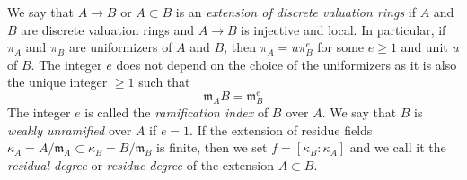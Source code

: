 \begin{definition}
\label{definition-extension-discrete-valuation-rings}
We say that $A \to B$ or $A \subset B$ is an
{\it extension of discrete valuation rings} if $A$ and $B$ are
discrete valuation rings and $A \to B$ is injective and local.
In particular, if $\pi_A$ and $\pi_B$ are uniformizers of
$A$ and $B$, then $\pi_A = u \pi_B^e$ for some $e \geq 1$ and unit
$u$ of $B$. The integer $e$ does not depend on the choice of
the uniformizers as it is also the unique integer $\geq 1$ such that
$$
\mathfrak m_A B = \mathfrak m_B^e
$$
The integer $e$ is called the {\it ramification index} of $B$ over $A$.
We say that $B$ is {\it weakly unramified} over $A$ if $e = 1$.
If the extension of residue fields
$\kappa_A = A/\mathfrak m_A \subset \kappa_B = B/\mathfrak m_B$
is finite, then we set $f = [\kappa_B : \kappa_A]$ and we
call it the {\it residual degree} or {\it residue degree}
of the extension $A \subset B$.
\end{definition}